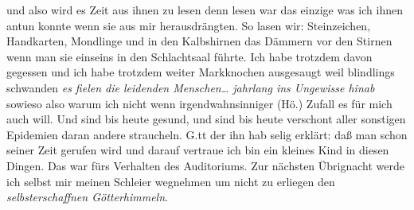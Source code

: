 \documentclass[
]{article}
\begin{document}
und also wird es Zeit aus ihnen zu lesen denn lesen war das einzige was
ich ihnen antun konnte wenn sie aus mir herausdrängten. So lasen wir:
Steinzeichen, Handkarten, Mondlinge und in den Kalbshirnen das Dämmern
vor den Stirnen wenn man sie einseins in den Schlachtsaal führte. Ich
habe trotzdem davon gegessen und ich habe trotzdem weiter Markknochen
ausgesaugt weil blindlings schwanden \emph{es fielen die leidenden
Menschen\ldots{} jahrlang ins Ungewisse hinab} sowieso also warum ich
nicht wenn irgendwahnsinniger (Hö.) Zufall es für mich auch will. Und
sind bis heute gesund, und sind bis heute verschont aller sonstigen
Epidemien daran andere straucheln. G.tt der ihn hab selig erklärt: daß
man schon seiner Zeit gerufen wird und darauf vertraue ich bin ein
kleines Kind in diesen Dingen. Das war fürs Verhalten des Auditoriums.
Zur nächsten Übrignacht werde ich selbst mir meinen Schleier wegnehmen
um nicht zu erliegen den \emph{selbsterschaffnen Götterhimmeln}.
\end{document}
